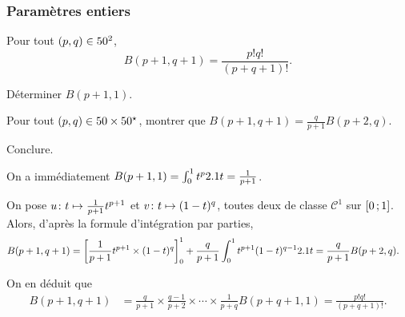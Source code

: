 \begin{comment}
\begin{defi}[Fonction bêta]
Pour tout $(p,q) \in \N^2$, on note
$$B(p, q) \defeq \int_{0}^{1} t^p (1-t)^q \d t.$$
\end{defi}
\end{comment}

\subsubsection{Paramètres entiers}

\begin{theo}
Pour tout $(p,q) \in \N^2$,
    $$B(p+1, q+1) = \frac{p! q!}{(p + q + 1)!}.$$
\end{theo}


\begin{exercice}
\begin{questions}
\item Déterminer $B(p+1, 1)$.

\item Pour tout $(p, q) \in \N \times \Ne$, montrer que $B(p+1, q+1) = \frac{q}{p + 1} B(p+2, q)$.

\item Conclure.
\end{questions}
\end{exercice}

\begin{solution}
\begin{reponses}
\item On a immédiatement $B(p+1, 1) = \int_0^1 t^p \d t = \frac{1}{p + 1}$.

\item On pose $\fonctionligne[u]{t}{\frac{1}{p+1} t^{p+1}}$ et $\fonctionligne[v]{t}{(1-t)^q}$, toutes deux de classe $\mathscr{C}^1$ sur $\interff{0}{1}$. Alors, d'après la formule d'intégration par parties, 
\begin{align*}
B(p+1, q+1)
&= \left[ \frac{1}{p+1}t^{p+1} \times (1-t)^q \right]_0^1 + \frac{q}{p+1} \int_0^1 t^{p+1} (1-t)^{q-1} \d t
= \frac{q}{p+1} B(p+2, q).
\end{align*}

On en déduit que 
\begin{align*}
B(p+1, q+1)
&= \frac{q}{p+1} \times \frac{q-1}{p+2} \times \cdots \times \frac{1}{p+q} B(p+q+1, 1)
= \frac{p! q!}{(p + q + 1)!}.
\end{align*}
\end{reponses}
\end{solution}

